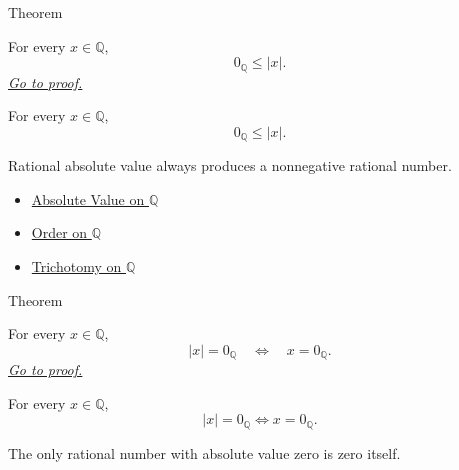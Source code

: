 \begin{theorembox}{Theorem}
\begin{theorem}
\label{thm:absolute-value-nonnegative-on-q}
For every $x\in\mathbb{Q}$,
\[
0_{\mathbb{Q}}\le |x|.
\]
\hyperref[prf:absolute-value-nonnegative-on-q]{\textit{Go to proof.}}
\end{theorem}
\end{theorembox}

\begin{remark*}
For every $x\in\mathbb{Q}$,
\[
0_{\mathbb{Q}}\le |x|.
\]
\end{remark*}

\begin{remark*}[Interpretation]
Rational absolute value always produces a nonnegative rational number.
\end{remark*}

\begin{dependencies}
\begin{itemize}
  \item \hyperref[def:absolute-value-on-q]{Absolute Value on $\mathbb{Q}$}
  \item \hyperref[def:order-on-q]{Order on $\mathbb{Q}$}
  \item \hyperref[thm:trichotomy-on-q]{Trichotomy on $\mathbb{Q}$}
\end{itemize}
\end{dependencies}

\begin{theorembox}{Theorem}
\begin{theorem}
\label{thm:absolute-value-zero-iff-on-q}
For every $x\in\mathbb{Q}$,
\[
|x|=0_{\mathbb{Q}}
\quad\Longleftrightarrow\quad
x=0_{\mathbb{Q}}.
\]
\hyperref[prf:absolute-value-zero-iff-on-q]{\textit{Go to proof.}}
\end{theorem}
\end{theorembox}

\begin{remark*}
For every $x\in\mathbb{Q}$,
\[
|x|=0_{\mathbb{Q}}\Longleftrightarrow x=0_{\mathbb{Q}}.
\]
\end{remark*}

\begin{remark*}[Interpretation]
The only rational number with absolute value zero is zero itself.
\end{remark*}

